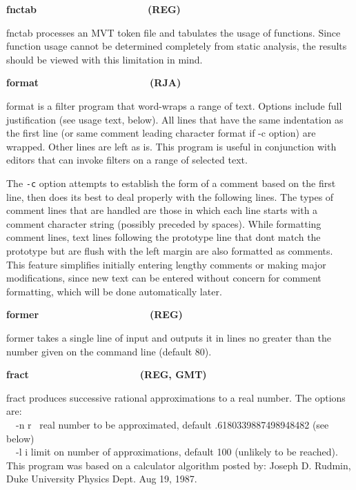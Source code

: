 {\sffamily\bfseries
fnctab\ \ \ \ \ \ \ \ \ \ \ \ \ \ \ \ \ \ \ \ (REG)}

\textsf{fnctab} processes an MVT token file and tabulates the usage of
functions. Since function usage cannot be determined completely from
static analysis, the results should be viewed with this limitation in
mind.

{\sffamily\bfseries
format\ \ \ \ \ \ \ \ \ \ \ \ \ \ \ \ \ \ \ \ (RJA)}

\textsf{format} is a filter program that word-wraps a range
of text. Options include full justification (see usage text, below).
All lines that have the same indentation as the first line (or same
comment leading character format if -c option) are wrapped. Other lines
are left as is. This program is useful in conjunction with editors that
can invoke filters on a range of selected text.

The \texttt{{}-c} option attempts to establish the form of a comment
based on the first line, then does its best to deal properly with the
following lines. The types of comment lines that are handled are those
in which each line starts with a {\textquotedbl}comment{\textquotedbl}
character string (possibly preceded by spaces). While formatting
comment lines, text lines following the prototype line
that don{\textquotesingle}t match the prototype but are flush with the
left margin are also formatted as comments. This feature simplifies
initially entering lengthy comments or making major modifications,
since new text can be entered without concern for comment formatting,
which will be done automatically later.

{\sffamily\bfseries
former\ \ \ \ \ \ \ \ \ \ \ \ \ \ \ \ \ \ \ \ (REG)}

\textsf{former} takes a single line of input and outputs it in lines no
greater than the number given on the command line (default 80). 

{\sffamily\bfseries
fract\ \ \ \ \ \ \ \ \ \ \ \ \ \ \ \ \ \ \ \ (REG, GMT)}

\textsf{fract} produces successive rational approximations to a real
number. The options are:\\
\ \ \textsf{{}-n r} \ real number to be approximated, default
.6180339887498948482 (see below)\\
\ \ \textsf{{}-l i} limit on number of approximations, default 100
(unlikely to be reached).\\
This program was based on a calculator algorithm posted by: Joseph D.
Rudmin, Duke University Physics Dept. Aug 19, 1987.

